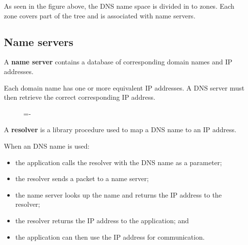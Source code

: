 \documentclass[a4paper]{systems-software}
\begin{document}
As seen in the figure above, the DNS name space is divided in to zones. Each zone covers part of the tree and is associated with name servers.


\subsection*{Name servers}

A \textbf{name server} contains a database of corresponding domain names and IP addresses.

Each domain name has one or more equivalent IP addresses. A DNS server must then retrieve the correct corresponding IP address.

\begin{figure}[H]
	\lineskip=-\fboxrule
\end{figure}

A \textbf{resolver} is a library procedure used to map a DNS name to an IP address.

When an DNS name is used:
\begin{itemize}
	\item the application calls the resolver with the DNS name as a parameter;
	\item the resolver sends a packet to a name server;
	\item the name server looks up the name and returns the IP address to the resolver;
	\item the resolver returns the IP address to the application; and
	\item the application can then use the IP address for communication.
\end{itemize}
\end{document}
